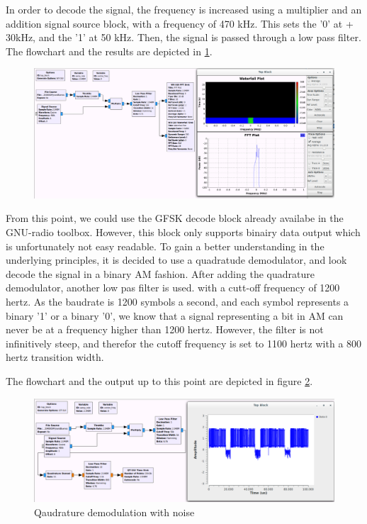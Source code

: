 In order to decode the signal, the frequency is increased using a multiplier and an addition signal source block, with a frequency of 470 kHz. This sets the '0' at + 30kHz, and the '1' at 50 kHz. Then, the signal is passed through a low pass filter. The flowchart and the results are depicted in \ref{fig:pijnacker_isolated}.



\begin{figure}[ht]
\centering
\includegraphics[width=1\linewidth]{figures/pijnacker_isolated}
\label{fig:pijnacker_isolated}
\end{figure}

From this point, we could use the GFSK decode block already availabe in the GNU-radio toolbox. However, this block only supports binairy data output which is unfortunately not easy readable. To gain a better understanding in the underlying principles, it is decided to use a quadratude demodulator, and look decode the signal in a binary AM fashion. After adding the quadrature demodulator, another low pas filter is used. with a cutt-off frequency of 1200 hertz. As the baudrate is 1200 symbols a second, and each symbol represents a binary '1' or a binary '0', we know that a signal representing a bit in AM can never be at a frequency higher than 1200 hertz. However, the filter is not infinitively steep, and therefor the cutoff frequency is set to 1100 hertz with a 800 hertz transition width. 

The flowchart and the output up to this point are depicted in figure \ref{fig:quaddemod_lowpas}. 


\begin{figure}[h]
\centering
\includegraphics[width=1\linewidth]{figures/pijnacker_quadrature_demod}
\caption[quadrature demodulation]{Qaudrature demodulation with noise}
\label{fig:quaddemod_lowpas}
\end{figure}
 
